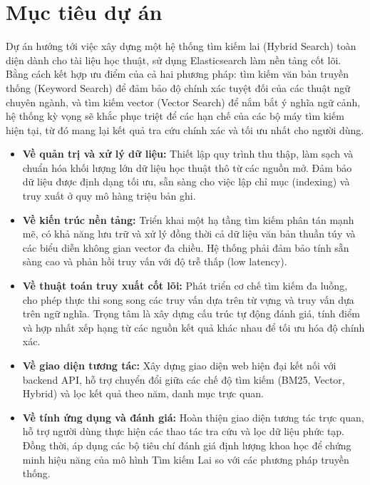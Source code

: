 \section{Mục tiêu dự án}
Dự án hướng tới việc xây dựng một hệ thống tìm kiếm lai (Hybrid Search) toàn diện dành cho tài liệu học thuật, sử dụng Elasticsearch làm nền tảng cốt lõi. Bằng cách kết hợp ưu điểm của cả hai phương pháp: tìm kiếm văn bản truyền thống (Keyword Search) để đảm bảo độ chính xác tuyệt đối của các thuật ngữ chuyên ngành, và tìm kiếm vector (Vector Search) để nắm bắt ý nghĩa ngữ cảnh, hệ thống kỳ vọng sẽ khắc phục triệt để các hạn chế của các bộ máy tìm kiếm hiện tại, từ đó mang lại kết quả tra cứu chính xác và tối ưu nhất cho người dùng.
\begin{itemize}
    \item \textbf{Về quản trị và xử lý dữ liệu:} Thiết lập quy trình thu thập, làm sạch và chuẩn hóa khối lượng lớn dữ liệu học thuật thô từ các nguồn mở. Đảm bảo dữ liệu được định dạng tối ưu, sẵn sàng cho việc lập chỉ mục (indexing) và truy xuất ở quy mô hàng triệu bản ghi.
    \item \textbf{Về kiến trúc nền tảng:} Triển khai một hạ tầng tìm kiếm phân tán mạnh mẽ, có khả năng lưu trữ và xử lý đồng thời cả dữ liệu văn bản thuần túy và các biểu diễn không gian vector đa chiều. Hệ thống phải đảm bảo tính sẵn sàng cao và phản hồi truy vấn với độ trễ thấp (low latency).
    \item \textbf{Về thuật toán truy xuất cốt lõi:} Phát triển cơ chế tìm kiếm đa luồng, cho phép thực thi song song các truy vấn dựa trên từ vựng và truy vấn dựa trên ngữ nghĩa. Trọng tâm là xây dựng cấu trúc tự động đánh giá, tính điểm và hợp nhất xếp hạng từ các nguồn kết quả khác nhau để tối ưu hóa độ chính xác.
    \item \textbf{Về giao diện tương tác:} Xây dựng giao diện web hiện đại kết nối với backend API, hỗ trợ chuyển đổi giữa các chế độ tìm kiếm (BM25, Vector, Hybrid) và lọc kết quả theo năm, danh mục trực quan.
    \item \textbf{Về tính ứng dụng và đánh giá:} Hoàn thiện giao diện tương tác trực quan, hỗ trợ người dùng thực hiện các thao tác tra cứu và lọc dữ liệu phức tạp. Đồng thời, áp dụng các bộ tiêu chí đánh giá định lượng khoa học để chứng minh hiệu năng của mô hình Tìm kiếm Lai so với các phương pháp truyền thống.
\end{itemize}


